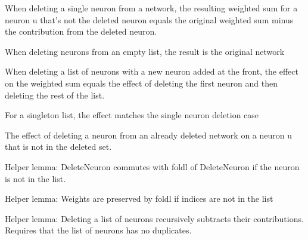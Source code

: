 \begin{lemma}\label{delete_single_neuron_step}
\leanok
When deleting a single neuron from a network, the resulting weighted sum for a neuron u
that's not the deleted neuron equals the original weighted sum minus the contribution
from the deleted neuron.
\end{lemma}

\begin{definition}\label{delete_empty_neurons_step}
When deleting neurons from an empty list, the result is the original network
\leanok
\end{definition}

\begin{definition}\label{delete_cons_neuron_step}
When deleting a list of neurons with a new neuron added at the front, the effect
    on the weighted sum equals the effect of deleting the first neuron and then
    deleting the rest of the list.
\leanok
\end{definition}

\begin{definition}\label{delete_singleton_neuron_step}
\uses{}
For a singleton list, the effect matches the single neuron deletion case
\leanok
\end{definition}

\begin{definition}\label{delete_neuron_from_deleted_network}
The effect of deleting a neuron from an already deleted network on a neuron u that
is not in the deleted set.
\leanok
\end{definition}

\begin{definition}\label{commute_delete_foldl}
\leanok
Helper lemma: DeleteNeuron commutes with foldl of DeleteNeuron if the neuron is not in the list.
\end{definition}


\begin{definition}\label{foldl_delete_preserves_weights}
\leanok
Helper lemma: Weights are preserved by foldl if indices are not in the list
\end{definition}

\begin{definition}\label{delete_neurons_recursive}
\leanok
Helper lemma: Deleting a list of neurons recursively subtracts their contributions.
    Requires that the list of neurons has no duplicates.
\end{definition}

